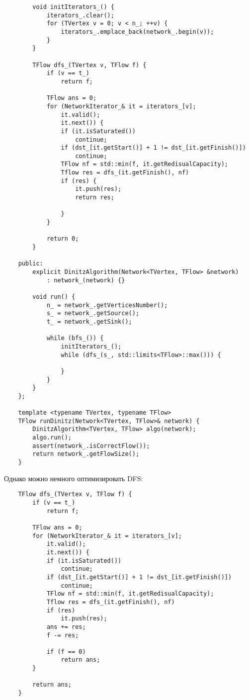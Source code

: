 \begin{lstlisting}
        void initIterators_() {
            iterators_.clear();
            for (TVertex v = 0; v < n_; ++v) {
                iterators_.emplace_back(network_.begin(v));
            }
        }

        TFlow dfs_(TVertex v, TFlow f) {
            if (v == t_) 
                return f;

            TFlow ans = 0;
            for (NetworkIterator_& it = iterators_[v];
                it.valid();
                it.next()) {
                if (it.isSaturated())
                    continue;
                if (dst_[it.getStart()] + 1 != dst_[it.getFinish()])
                    continue;
                TFlow nf = std::min(f, it.getRedisualCapacity);
                Tflow res = dfs_(it.getFinish(), nf)
                if (res) {
                    it.push(res);
                    return res;
                    
                }
            }

            return 0;
        }

    public:
        explicit DinitzAlgorithm(Network<TVertex, TFlow> &network)
            : network_(network) {}

        void run() {
            n_ = network_.getVerticesNumber();
            s_ = network_.getSource();
            t_ = network_.getSink();

            while (bfs_()) {
                initIterators_();
                while (dfs_(s_, std::limits<TFlow>::max())) {

                }
            }
        }
    };

    template <typename TVertex, typename TFlow>
    TFlow runDinitz(Network<TVertex, TFlow>& network) {
        DinitzAlgorithm<TVertex, TFlow> algo(network);
        algo.run();
        assert(network_.isCorrectFlow());
        return network_.getFlowSize();
    }
\end{lstlisting}

\noindent Однако можно немного оптимизировать DFS:

\begin{lstlisting}
    TFlow dfs_(TVertex v, TFlow f) {
        if (v == t_) 
            return f;

        TFlow ans = 0;
        for (NetworkIterator_& it = iterators_[v];
            it.valid();
            it.next()) {
            if (it.isSaturated())
                continue;
            if (dst_[it.getStart()] + 1 != dst_[it.getFinish()])
                continue;
            TFlow nf = std::min(f, it.getRedisualCapacity);
            Tflow res = dfs_(it.getFinish(), nf)
            if (res)
                it.push(res);
            ans += res;
            f -= res;

            if (f == 0)
                return ans;
        }

        return ans;
    }
\end{lstlisting}

